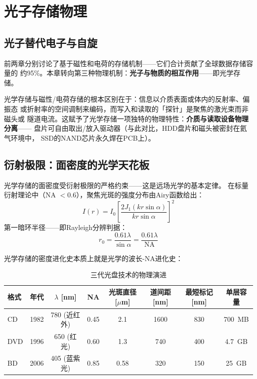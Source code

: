 \documentclass[11pt,a4paper,openany]{book}
\theoremstyle{definition}
\theoremstyle{plain}
\theoremstyle{remark}
\begin{document}
\chapter{光子存储物理}
\label{ch:optical}

\section{光子替代电子与自旋}

前两章分别讨论了基于磁性和电荷的存储机制——它们合计贡献了全球数据存储容量的
约95\%。本章转向第三种物理机制：\textbf{光子与物质的相互作用}——即光学存储。

光学存储与磁性/电荷存储的根本区别在于：信息以介质表面或体内的反射率、偏振态
或折射率的空间调制来编码，而写入和读取的「探针」是聚焦的激光束而非磁头或
隧道电流。这赋予了光学存储一项独特的物理特性：\textbf{介质与读取设备物理分离}——
盘片可自由取出/放入驱动器（与此对比，HDD盘片和磁头被密封在氦气环境中，
SSD的NAND芯片永久焊在PCB上）。

\section{衍射极限：面密度的光学天花板}

光学存储的面密度受衍射极限的严格约束——这是远场光学的基本定律。
在标量衍射理论中（NA $< 0.6$），聚焦光斑的强度分布由Airy函数给出：
\begin{equation}\label{eq:airy}
  I(r) = I_0 \left[ \frac{2 J_1(k r\sin\alpha)}{k r\sin\alpha} \right]^2
\end{equation}
第一暗环半径——即Rayleigh分辨判据：
\begin{equation}
  r_0 = \frac{0.61\lambda}{\sin\alpha} = \frac{0.61\lambda}{\text{NA}}
\end{equation}

光学存储的密度进化史本质上就是光学的波长-NA进化史：

\begin{table}[H]
\centering
\caption{三代光盘技术的物理演进}
\begin{tabular}{@{}lccccccc@{}}
\toprule
格式 & 年代 & $\lambda$ [nm] & NA & 光斑直径 [$\mu$m] & 道间距 [nm] & 最短标记 [nm] & 单层容量 \\
\midrule
CD   & 1982 & 780 (近红外) & 0.45 & 2.1  & 1600 & 830  & \SI{700}{MB} \\
DVD  & 1996 & 650 (红光)   & 0.60 & 1.3  & 740  & 400  & \SI{4.7}{GB} \\
BD   & 2006 & 405 (蓝紫光) & 0.85 & 0.58 & 320  & 150  & \SI{25}{GB} \\
\bottomrule
\end{tabular}
\end{table}
\end{document}
